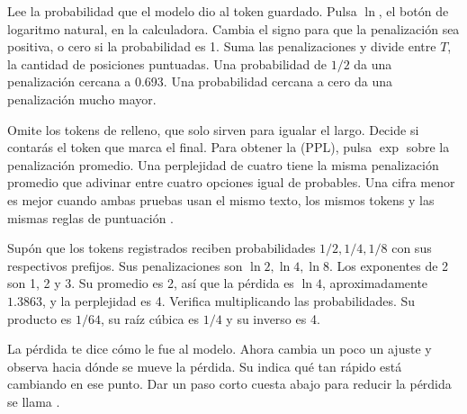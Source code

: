 {Lee la probabilidad que el modelo dio al token guardado. Pulsa \(\ln\), el botón de logaritmo natural, en la calculadora. Cambia el signo para que la penalización sea positiva, o cero si la probabilidad es 1. Suma las penalizaciones y divide entre \(T\), la cantidad de posiciones puntuadas. Una probabilidad de \(1/2\) da una penalización cercana a 0.693. Una probabilidad cercana a cero da una penalización mucho mayor.

Omite los tokens de relleno, que solo sirven para igualar el largo. Decide si contarás el token que marca el final. Para obtener la  (\(\mathrm{PPL}\)), pulsa \(\exp\) sobre la penalización promedio. Una perplejidad de cuatro tiene la misma penalización promedio que adivinar entre cuatro opciones igual de probables. Una cifra menor es mejor cuando ambas pruebas usan el mismo texto, los mismos tokens y las mismas reglas de puntuación \citep{xiao}.}

{Supón que los tokens registrados reciben probabilidades \(1/2,1/4,1/8\) con sus respectivos prefijos. Sus penalizaciones son \(\ln 2,\ln 4,\ln 8\). Los exponentes de 2 son 1, 2 y 3. Su promedio es 2, así que la pérdida es \(\ln 4\), aproximadamente \(1.3863\), y la perplejidad es 4. Verifica multiplicando las probabilidades. Su producto es \(1/64\), su raíz cúbica es \(1/4\) y su inverso es 4.}

{La pérdida te dice cómo le fue al modelo. Ahora cambia un poco un ajuste y observa hacia dónde se mueve la pérdida. Su  indica qué tan rápido está cambiando en ese punto. Dar un paso corto cuesta abajo para reducir la pérdida se llama .}


